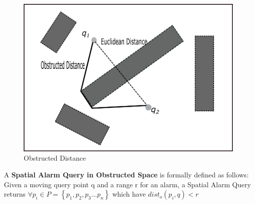 \begin{figure}[h]
  \includegraphics[width=\linewidth]{obstructed_distance.png}
  \caption{Obstructed Distance}
  \label{fig:odist}
\end{figure}
\vspace{2mm}


A \textbf{Spatial Alarm Query in Obstructed Space} is formally defined as follows:
Given a moving query point q and a range r for an alarm, a Spatial Alarm Query returns $\forall p_i \in P=\left\lbrace p_1,p_2,p_3...p_n\right\rbrace  $ which have $dist_o(p_i,q)<r $

